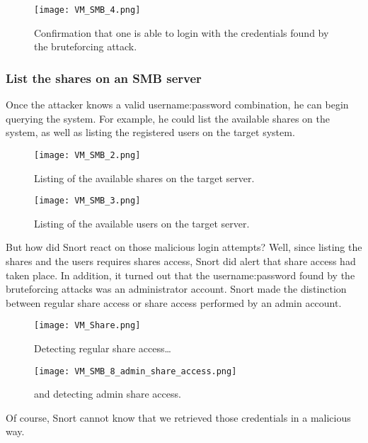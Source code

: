 \begin{figure}[h]
    \centering
    \texttt{[image: VM\_SMB\_4.png]}
    \caption{Confirmation that one is able to login with the credentials found by the bruteforcing attack.}
\end{figure}

\clearpage

\subsubsection{List the shares on an SMB server}

Once the attacker knows a valid username:password combination, he can begin querying the system. For example, he could list the available shares on the system, as well as listing the registered users on the target system.

\begin{figure}[h]
    \centering
    \texttt{[image: VM\_SMB\_2.png]}
    \caption{Listing of the available shares on the target server.}
\end{figure}

\begin{figure}[h]
    \centering
    \texttt{[image: VM\_SMB\_3.png]}
    \caption{Listing of the available users on the target server.}
\end{figure}

But how did Snort react on those malicious login attempts? Well, since listing the shares and the users requires shares access, Snort did alert that share access had taken place. In addition, it turned out that the username:password found by the bruteforcing attacks was an administrator account. Snort made the distinction between regular share access or share access performed by an admin account.

\begin{figure}[h]
    \centering
    \texttt{[image: VM\_Share.png]}
    \caption{Detecting regular share access\ldots}
\end{figure}

\begin{figure}[h]
    \centering
    \texttt{[image: VM\_SMB\_8\_admin\_share\_access.png]}
    \caption{and detecting admin share access.}
\end{figure}

Of course, Snort cannot know that we retrieved those credentials in a malicious way. \\ \\

